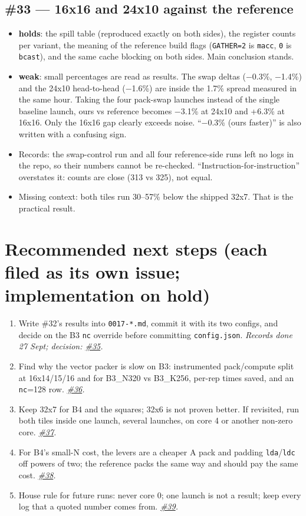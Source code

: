 \documentclass[10pt,a4paper]{article}
\newcommand{\ok}{\textcolor{green!45!black}{\textbf{holds}}}
\newcommand{\weak}{\textcolor{orange!80!black}{\textbf{weak}}}
\newcommand{\iss}[1]{\href{https://github.com/JieGH/RVV_code_gen_via_MLIR_xDSL/issues/#1}{\##1}}
\begin{document}
\subsection*{\#33 --- 16x16 and 24x10 against the reference}
\begin{itemize}
  \item \ok: the spill table (reproduced exactly on both sides), the register counts per variant, the
  meaning of the reference build flags (\texttt{GATHER=2} is \texttt{macc}, \texttt{0} is
  \texttt{bcast}), and the same cache blocking on both sides. Main conclusion stands.
  \item \weak: small percentages are read as results. The swap deltas ($-$0.3\%, $-$1.4\%) and the
  24x10 head-to-head ($-$1.6\%) are inside the 1.7\% spread measured in the same hour. Taking the four
  pack-swap launches instead of the single baseline launch, ours vs reference becomes $-$3.1\% at 24x10
  and +6.3\% at 16x16. Only the 16x16 gap clearly exceeds noise. ``$-$0.3\% (ours faster)'' is also
  written with a confusing sign.
  \item Records: the swap-control run and all four reference-side runs left no logs in the repo, so
  their numbers cannot be re-checked. ``Instruction-for-instruction'' overstates it: counts are close
  (313 vs 325), not equal.
  \item Missing context: both tiles run 30--57\% below the shipped 32x7. That is the practical result.
\end{itemize}

\section{Recommended next steps (each filed as its own issue; implementation on hold)}
\begin{enumerate}
  \item Write \#32's results into \texttt{0017-*.md}, commit it with its two configs, and decide on
  the B3 \texttt{nc} override before committing \texttt{config.json}. \emph{Records done 27 Sept; decision: \iss{35}.}
  \item Find why the vector packer is slow on B3: instrumented pack/compute split at 16x14/15/16 and
  for B3\_N320 vs B3\_K256, per-rep times saved, and an \texttt{nc}=128 row. \emph{\iss{36}.}
  \item Keep 32x7 for B4 and the squares; 32x6 is not proven better. If revisited, run both tiles
  inside one launch, several launches, on core 4 or another non-zero core. \emph{\iss{37}.}
  \item For B4's small-N cost, the levers are a cheaper A pack and padding \texttt{lda}/\texttt{ldc}
  off powers of two; the reference packs the same way and should pay the same cost. \emph{\iss{38}.}
  \item House rule for future runs: never core 0; one launch is not a result; keep every log that a
  quoted number comes from. \emph{\iss{39}.}
\end{enumerate}
\end{document}
